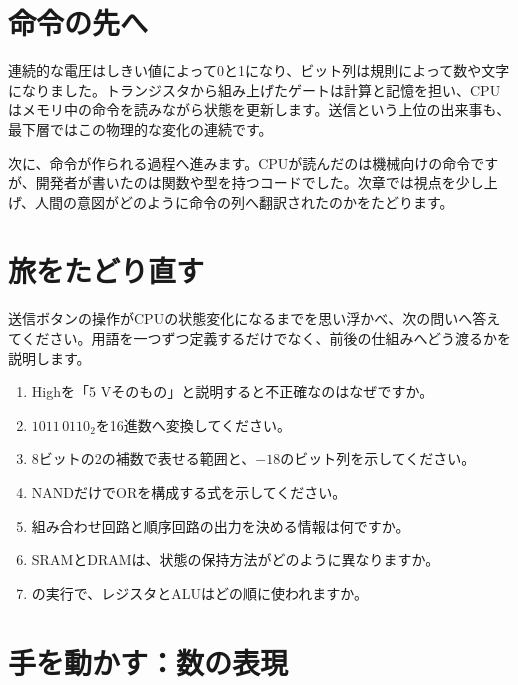 \section{命令の先へ}
\label{sec:01-digital-computer-18}

連続的な電圧はしきい値によって0と1になり、ビット列は規則によって数や文字になりました。トランジスタから組み上げたゲートは計算と記憶を担い、CPUはメモリ中の命令を読みながら状態を更新します。送信という上位の出来事も、最下層ではこの物理的な変化の連続です。

次に、命令が作られる過程へ進みます。CPUが読んだのは機械向けの命令ですが、開発者が書いたのは関数や型を持つコードでした。次章では視点を少し上げ、人間の意図がどのように命令の列へ翻訳されたのかをたどります。



\section{旅をたどり直す}
\label{sec:01-digital-computer-19}

送信ボタンの操作がCPUの状態変化になるまでを思い浮かべ、次の問いへ答えてください。用語を一つずつ定義するだけでなく、前後の仕組みへどう渡るかを説明します。

\begingroup
  \begin{enumerate}
    \item Highを「5 Vそのもの」と説明すると不正確なのはなぜですか。
    \item $1011\,0110_2$を16進数へ変換してください。
    \item 8ビットの2の補数で表せる範囲と、$-18$のビット列を示してください。
    \item NANDだけでORを構成する式を示してください。
    \item 組み合わせ回路と順序回路の出力を決める情報は何ですか。
    \item SRAMとDRAMは、状態の保持方法がどのように異なりますか。
    \item {} の実行で、レジスタとALUはどの順に使われますか。
  \end{enumerate}
\par
\endgroup


\section{手を動かす：数の表現}
\label{sec:01-digital-computer-20}

